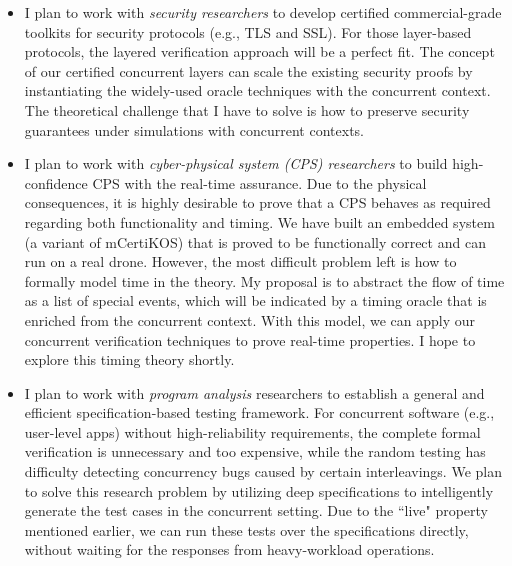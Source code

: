 \documentclass[a4paper, 10pt]{article}
\begin{document}
\begin{small}
\begin{itemize}
\item I plan to work with \emph{security researchers}
to  develop certified 
commercial-grade toolkits for security
protocols (e.g., TLS and SSL). 
For those layer-based protocols, the layered verification approach will be a perfect fit.
The concept of our certified concurrent  layers can scale the existing security proofs by instantiating the widely-used oracle techniques
with the concurrent context. The theoretical challenge that I have to solve is
how to preserve security guarantees under simulations with concurrent contexts.

\item I plan to work with
\emph{cyber-physical system (CPS) researchers} to build
high-confidence CPS with the real-time assurance.
Due to the physical consequences, it is highly desirable to
prove that a CPS behaves as required regarding both functionality and timing. 
We have built an embedded system (a variant of mCertiKOS) that is proved to be functionally correct and can run on a real drone. However, the most difficult problem left is how to formally
model  time in the theory. My proposal is to abstract the flow of time  as a list of special events, which will be indicated by a timing oracle that is enriched from the concurrent context.
With this model, we can apply 
our concurrent verification techniques to prove
 real-time properties. I hope to explore this timing theory shortly.
 
\begin{comment}
However, it is still a big challenge on how to formally model the time. We believe that the cure is still the event-based concurrent context.  
I am looking forward to exploring this huge research opportunity when combining the formal verification with CPS.
\end{comment}

\item I plan to work with
\emph{program analysis} researchers to establish a general and efficient specification-based testing framework.
For concurrent software (e.g., user-level apps) without high-reliability requirements, 
the complete formal verification is unnecessary and too expensive,
while the
random testing has difficulty detecting concurrency bugs caused by certain interleavings.
We plan to solve this research problem by utilizing deep specifications to intelligently generate the test cases
 in the concurrent setting. Due to the ``live" property mentioned earlier, we can run these tests  over the specifications directly, without waiting for the responses from heavy-workload operations. 


\end{itemize}
\end{small}
\end{document}
